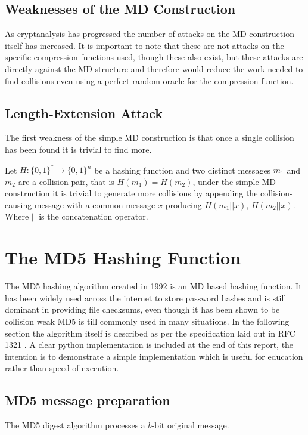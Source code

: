 \documentclass[a4paper,12pt]{article}
\begin{document}
\subsection{Weaknesses of the MD Construction}
As cryptanalysis has progressed the number of attacks on the MD construction itself has increased\cite{dobbertin}\cite{Xie2013}. It is important to note that these are not attacks on the specific compression functions used, though these also exist, but these attacks are directly against the MD structure and therefore would reduce the work needed to find collisions even using a perfect random-oracle for the compression function.

\subsection{Length-Extension Attack}
The first weakness of the simple MD construction is that once a single collision has been found it is trivial to find more\cite{Sasaki2006}. 

Let $H: \{0,1\}^* \rightarrow \{0,1\}^n$ be a hashing function and two distinct messages $m_1$ and $m_2$ are a collision pair, that is $H(m_1) = H(m_2)$, under the simple MD construction it is trivial to generate more collisions by appending the collision-causing message with a common message $x$ producing $H(m_1||x)$, $H(m_2||x)$.  Where $||$ is the concatenation operator.


\label{sec:length}

\section{The MD5 Hashing Function}
The MD5 hashing algorithm\cite{Rivest} created in 1992 is an MD based hashing function. It has been widely used across the internet to store password hashes and is still dominant in providing file checksums, even though it has been shown to be collision weak MD5 is till commonly used in many situations. In the following section the algorithm itself is described as per the specification laid out in RFC 1321 \cite{Rivest}. A clear python implementation is included at the end of this report, the intention is to demonstrate a simple implementation which is useful for education rather than speed of execution.

\subsection{MD5 message preparation}
The MD5 digest algorithm processes a $b$-bit original message.
\end{document}
